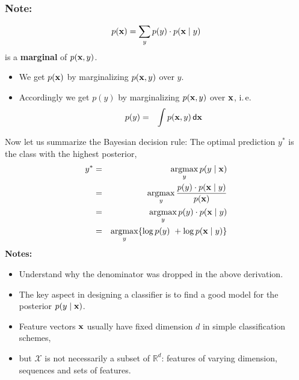 	\subsubsection{Note:}
	\begin{displaymath}
		p(\bm{\mathrm{x}}) = \sum\limits_{y}p(y) \cdot p(\bm{\mathrm{x}} \mid y)
	\end{displaymath}
	is a \textbf{marginal} of $p(\bm{\mathrm{x}} , y)$.
	\begin{itemize}
		\item We get $p(\bm{\mathrm{x}})$ by marginalizing $p(\bm{\mathrm{x}}, y)$ over $y$.
		\item Accordingly we get $p(y)$ by marginalizing $p(\bm{\mathrm{x}}, y)$ over $\bm{\mathrm{x}}$, i.\,e.
		      \begin{eqnarray*}
			      p(y)&=& \int p(\bm{\mathrm{x}}, y) \, \mathsf{d}\bm{\mathrm{x}}
		      \end{eqnarray*}
	\end{itemize}
	Now let us summarize the Bayesian decision rule: The optimal prediction $y^*$ is the class with the highest posterior,
	\begin{eqnarray*}
		y^* &=&   \operatorname*{argmax}\limits_{y} p(y \mid \bm{\mathrm{x}}) \\
		&=& \operatorname*{argmax}_y \frac{p(y) \cdot p(\bm{\mathrm{x}} \mid y)}{p(\bm{\mathrm{x}})} \\
		&=& \operatorname*{argmax}_y p(y) \cdot p(\bm{\mathrm{x}} \mid y) \\
		&=& \operatorname*{argmax}_y\{\log p(y)\ + \log p(\bm{\mathrm{x}} \mid y)\} 
	\end{eqnarray*}
	\textbf{Notes:} 
	\begin{itemize}
    \item Understand why the denominator was dropped in the above derivation. 
		\item The key aspect in designing a classifier is to find a good model for the posterior $p(y\mid\bm{\mathrm{x}})$.
		\item Feature vectors $\bm{\mathrm{x}}$ usually have fixed dimension $d$ in simple classification schemes,
		\item but ${\mathcal{X}}$ is not necessarily a subset of $\mathbb{R}^d$: features of varying dimension, sequences and sets of features.
	\end{itemize}

